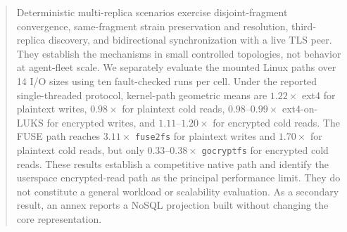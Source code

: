 \begin{abstract}
Deterministic multi-replica scenarios exercise disjoint-fragment convergence,
same-fragment strain preservation and resolution, third-replica discovery, and
bidirectional synchronization with a live TLS peer.  They establish the
mechanisms in small controlled topologies, not behavior at agent-fleet scale.
We separately evaluate the mounted Linux paths over 14 I/O sizes using ten
fault-checked runs per cell.  Under the reported single-threaded protocol,
kernel-path geometric means are $1.22\times$ ext4 for plaintext writes,
$0.98\times$ for plaintext cold reads, $0.98$--$0.99\times$ ext4-on-LUKS for
encrypted writes,
and $1.11$--$1.20\times$ for encrypted cold reads.  The FUSE path reaches
$3.11\times$ \texttt{fuse2fs} for plaintext writes and $1.70\times$ for
plaintext cold reads, but only $0.33$--$0.38\times$ \texttt{gocryptfs} for
encrypted cold reads.  These results establish a competitive native path and
identify the userspace encrypted-read path as the principal performance limit.
They do not constitute a general workload or scalability evaluation.  As a
secondary result, an annex reports a NoSQL projection built without changing
the core representation.
\end{abstract}
